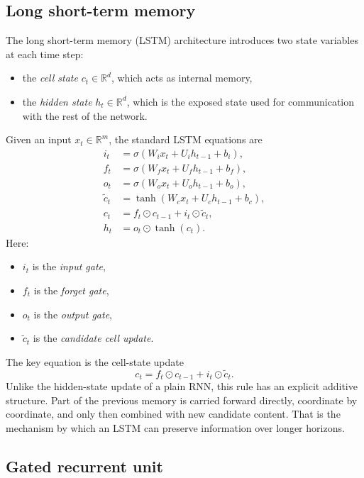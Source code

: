 \subsection*{Long short-term memory}

The long short-term memory (LSTM) architecture introduces two state variables at each time step:
\begin{itemize}
    \item the \emph{cell state} $c_t \in \mathbb{R}^d$, which acts as internal memory,
    \item the \emph{hidden state} $h_t \in \mathbb{R}^d$, which is the exposed state used for communication with the rest of the network.
\end{itemize}
Given an input $x_t \in \mathbb{R}^m$, the standard LSTM equations are
\begin{align*}
 i_t &= \sigma(W_i x_t + U_i h_{t-1} + b_i),\\
 f_t &= \sigma(W_f x_t + U_f h_{t-1} + b_f),\\
 o_t &= \sigma(W_o x_t + U_o h_{t-1} + b_o),\\
 \widetilde{c}_t &= \tanh(W_c x_t + U_c h_{t-1} + b_c),\\
 c_t &= f_t \odot c_{t-1} + i_t \odot \widetilde{c}_t,\\
 h_t &= o_t \odot \tanh(c_t).
\end{align*}
Here:
\begin{itemize}
    \item $i_t$ is the \emph{input gate},
    \item $f_t$ is the \emph{forget gate},
    \item $o_t$ is the \emph{output gate},
    \item $\widetilde{c}_t$ is the \emph{candidate cell update}.
\end{itemize}

\medskip

The key equation is the cell-state update
\[
 c_t = f_t \odot c_{t-1} + i_t \odot \widetilde{c}_t.
\]
Unlike the hidden-state update of a plain RNN, this rule has an explicit additive structure.
Part of the previous memory is carried forward directly, coordinate by coordinate, and only then combined with new candidate content.
That is the mechanism by which an LSTM can preserve information over longer horizons.

\subsection*{Gated recurrent unit}

